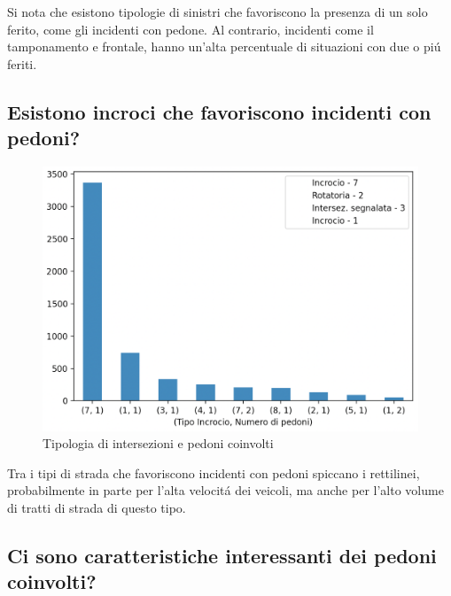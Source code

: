 \documentclass[a4paper]{report}
\begin{document}
Si nota che esistono tipologie di sinistri che favoriscono la presenza di un solo ferito, 
come gli incidenti con pedone. Al contrario, incidenti come il tamponamento e frontale, 
hanno un'alta percentuale di situazioni con due o pi\'u feriti.


\clearpage
\subsection{Esistono incroci che favoriscono incidenti con pedoni?}

\begin{figure}[!ht]
    \includegraphics[width=\linewidth]{../src/incidenti/incidenti_senza_coords/pedoni/pedoni_incroci.png}
    \caption{Tipologia di intersezioni e pedoni coinvolti}
    \label{fig:pedoni_intersezioni}
\end{figure}

Tra i tipi di strada che favoriscono incidenti con pedoni spiccano i rettilinei, 
probabilmente in parte per l'alta velocit\'a dei veicoli, ma anche per l'alto volume di
tratti di strada di questo tipo.


\clearpage
\subsection{Ci sono caratteristiche interessanti dei pedoni coinvolti?}
\end{document}
